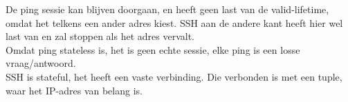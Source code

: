 De ping sessie kan blijven doorgaan, en heeft geen last van de valid-lifetime, omdat het telkens een ander adres kiest. SSH aan de andere kant heeft hier wel last van en zal stoppen als het adres vervalt. \\

Omdat ping stateless is, het is geen echte sessie, elke ping is een losse vraag/antwoord. \\

SSH is stateful, het heeft een vaste verbinding. Die verbonden is met een tuple, waar het IP-adres van belang is. 